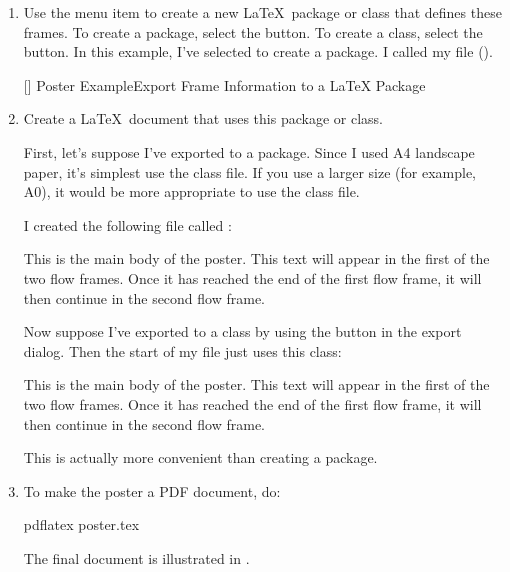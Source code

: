 \begin{enumerate}
[]
{}
{Poster Example\dash Export to PDF Document}


\item Use the  menu item to create
a new \LaTeX\ package or class that defines these frames. To create
a package, select the  button. To create a class,
select the  button. In this example, 
I've selected  to create a package.
I called my file  ().

[]
{}
{Poster Example\dash Export Frame Information to a \LaTeX{} Package}

\item Create a \LaTeX\ document that uses this package or class.

First, let's suppose I've exported to a package. Since I
used A4 landscape paper, it's simplest use the 
class file. If you use a larger size (for example, A0), it would be more
appropriate to use the  class file.

I created the following file called :
\begin{codebox}
\codepar
{}
\codepar
{}
\codepar
This is the main body of the poster. This text will
appear in the first of the two flow frames. Once it
has reached the end of the first flow frame, it 
will then continue in the second flow frame.
\codepar
{}
\codepar
{}
\end{codebox}

Now suppose I've exported to a class by using the
 button in the export dialog. Then the start of my
 file just uses this class:
\begin{codebox}
\codepar
{}
This is the main body of the poster. This text will
appear in the first of the two flow frames. Once it
has reached the end of the first flow frame, it 
will then continue in the second flow frame.
\codepar
{}
\codepar
{}
\end{codebox}
This is actually more convenient than creating a package.

\item To make the poster a PDF document, do:
\begin{terminal}
pdflatex poster.tex
\end{terminal}%
The final document is illustrated in .
\end{enumerate}

